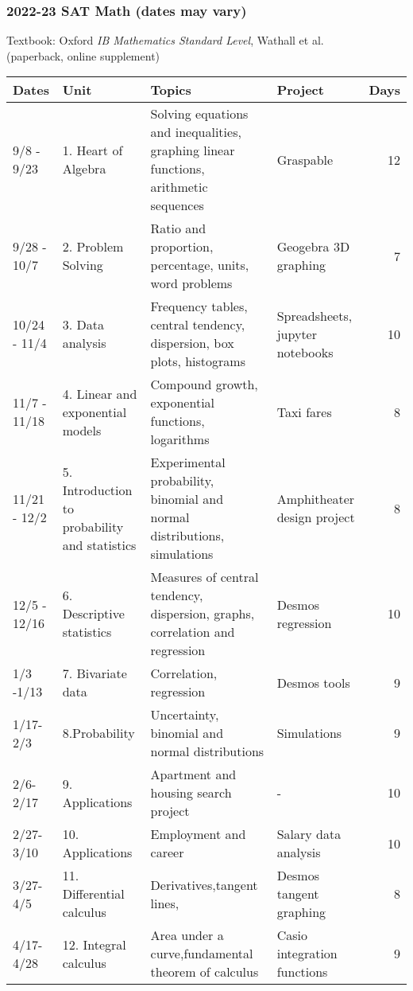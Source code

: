 \documentclass[12pt, twoside]{article}
\begin{document}
\newpage

\subsubsection*{2022-23 SAT Math (dates may vary)} 
Textbook: Oxford \emph{IB Mathematics Standard Level}, Wathall et al. \\
(paperback, online supplement) \par \medskip
\begin{tabular}{|p{2.4cm}|p{5.5cm}|p{8cm}|p{4cm}|r|}
  \hline
  Dates & Unit & Topics  & Project & Days \\
  \hline
  9/8 - 9/23 & 1. Heart of Algebra & Solving equations and inequalities, graphing linear functions, arithmetic sequences & Graspable& 12 \\
  \hline
  9/28 - 10/7 & 2. Problem Solving & Ratio and proportion, percentage, units, word problems & Geogebra 3D graphing & 7 \\
  \hline
  10/24 - 11/4 & 3. Data analysis & Frequency tables, central tendency, dispersion, box plots, histograms & Spreadsheets, jupyter notebooks & 10 \\
  \hline
  11/7 - 11/18 & 4. Linear and exponential models & Compound growth, exponential functions, logarithms & Taxi fares & 8 \\
  \hline
  11/21 - 12/2 & 5. Introduction to probability and statistics & Experimental probability, binomial and normal distributions, simulations & Amphitheater design project & 8 \\
  \hline
  12/5 - 12/16 & 6. Descriptive statistics & Measures of central tendency, dispersion, graphs, correlation and regression & Desmos regression & 10 \\
    \hline
    1/3 -1/13 & 7. Bivariate data & Correlation, regression  & Desmos tools & 9 \\
    \hline
    1/17-2/3 & 8.Probability & Uncertainty, binomial and normal distributions & Simulations & 9 \\
    \hline
    2/6-2/17 & 9. Applications & Apartment and housing search project & - & 10 \\
    \hline
    2/27-3/10 & 10. Applications & Employment and career & Salary data analysis & 10 \\
    \hline
    3/27-4/5 & 11. Differential calculus & Derivatives,tangent lines,&Desmos tangent graphing & 8 \\
    \hline
    4/17-4/28 & 12. Integral calculus & Area under a curve,fundamental theorem of calculus & Casio integration functions & 9 \\
    \hline
\end{tabular}
\end{document}
